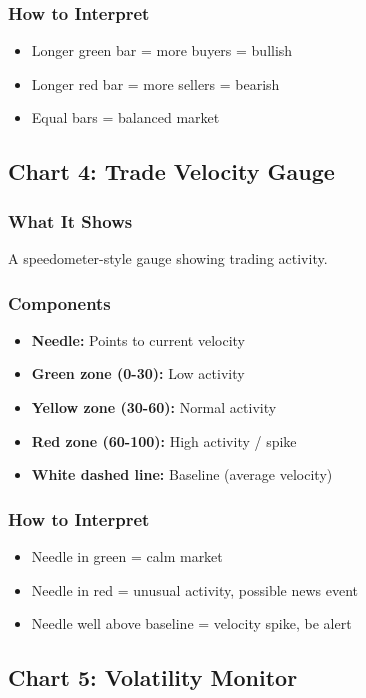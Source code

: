 \documentclass[12pt,a4paper]{article}
\begin{document}
\subsubsection{How to Interpret}
\begin{itemize}
    \item Longer green bar = more buyers = bullish
    \item Longer red bar = more sellers = bearish
    \item Equal bars = balanced market
\end{itemize}

\subsection{Chart 4: Trade Velocity Gauge}

\subsubsection{What It Shows}
A speedometer-style gauge showing trading activity.

\subsubsection{Components}
\begin{itemize}
    \item \textbf{Needle:} Points to current velocity
    \item \textbf{Green zone (0-30):} Low activity
    \item \textbf{Yellow zone (30-60):} Normal activity
    \item \textbf{Red zone (60-100):} High activity / spike
    \item \textbf{White dashed line:} Baseline (average velocity)
\end{itemize}

\subsubsection{How to Interpret}
\begin{itemize}
    \item Needle in green = calm market
    \item Needle in red = unusual activity, possible news event
    \item Needle well above baseline = velocity spike, be alert
\end{itemize}

\subsection{Chart 5: Volatility Monitor}
\end{document}
